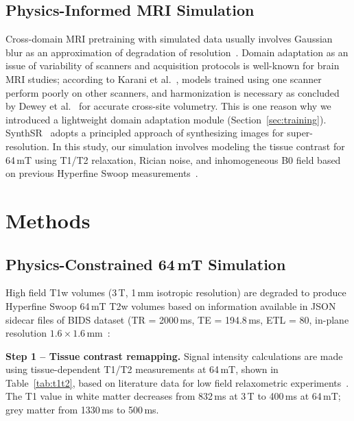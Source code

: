 \documentclass[12pt,a4paper]{article}
\begin{document}
\subsection{Physics-Informed MRI Simulation}

Cross-domain MRI pretraining with simulated data usually involves Gaussian
blur as an approximation of degradation of
resolution~\cite{zhao2021superresolution}. Domain adaptation as an issue of
variability of scanners and acquisition protocols is well-known for brain MRI
studies; according to Karani et al.~\cite{karani2018lifelong}, models trained
using one scanner perform poorly on other scanners, and harmonization is
necessary as concluded by Dewey et al.~\cite{dewey2019deepharmony} for
accurate cross-site volumetry. This is one reason why we introduced a
lightweight domain adaptation module (Section~\ref{sec:training}).
SynthSR~\cite{iglesias2023synthsr} adopts a principled approach of
synthesizing images for super-resolution. In this study, our simulation
involves modeling the tissue contrast for 64\,mT using T1/T2 relaxation,
Rician noise, and inhomogeneous B0 field based on previous Hyperfine Swoop
measurements~\cite{vasa2025}.

\section{Methods}
\label{sec:methods}

\subsection{Physics-Constrained 64\,mT Simulation}
\label{sec:sim}

High field T1w volumes (3\,T, 1\,mm isotropic resolution) are degraded to
produce Hyperfine Swoop 64\,mT T2w volumes based on information available in
JSON sidecar files of BIDS dataset (TR = 2000\,ms, TE = 194.8\,ms, ETL = 80,
in-plane resolution $1.6 \times 1.6$\,mm~\cite{vasa2025}:

\textbf{Step 1 -- Tissue contrast remapping.}
Signal intensity calculations are made using tissue-dependent T1/T2
measurements at 64\,mT, shown in Table~\ref{tab:t1t2}, based on literature
data for low field relaxometric experiments~\cite{deichmann2002}. The T1
value in white matter decreases from 832\,ms at 3\,T to 400\,ms at 64\,mT;
grey matter from 1330\,ms to 500\,ms.
\end{document}
